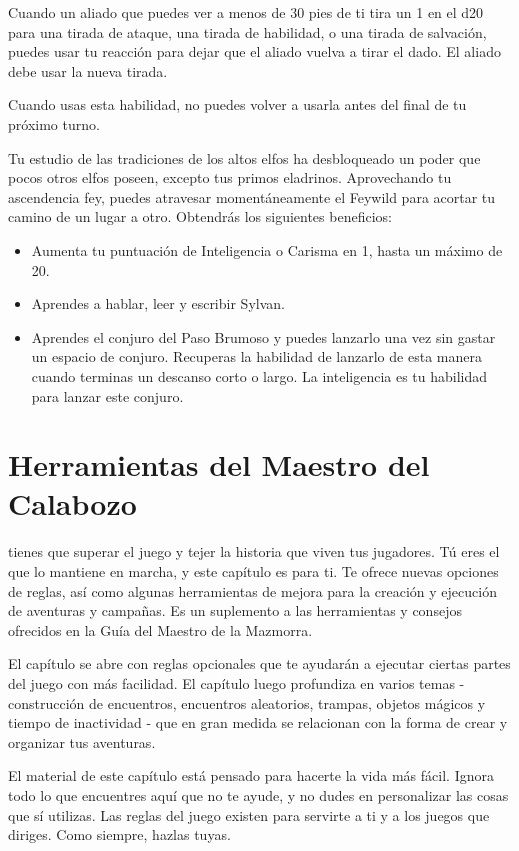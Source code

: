 \documentclass[a4paper,twocolumn,openany,10pt]{dndbook}
\begin{document}
Cuando un aliado que puedes ver a menos de 30 pies de ti tira un 1 en el d20 para una tirada de ataque, una tirada de habilidad,
o una tirada de salvación, puedes usar tu reacción para dejar que el aliado vuelva a tirar el dado. El aliado debe usar la nueva
tirada.

Cuando usas esta habilidad, no puedes volver a usarla antes del final de tu próximo turno.

Tu estudio de las tradiciones de los altos elfos ha desbloqueado un poder que pocos otros elfos poseen, excepto tus primos
eladrinos. Aprovechando tu ascendencia fey, puedes atravesar momentáneamente el Feywild para acortar tu camino de un lugar a
otro. Obtendrás los siguientes beneficios:
\begin{itemize}
\item Aumenta tu puntuación de Inteligencia o Carisma en 1, hasta un máximo de 20.
\item Aprendes a hablar, leer y escribir Sylvan.
\item Aprendes el conjuro del Paso Brumoso y puedes lanzarlo una vez sin gastar un espacio de conjuro. Recuperas la habilidad
de lanzarlo de esta manera cuando terminas un descanso corto o largo. La inteligencia es tu habilidad para lanzar este conjuro.
\end{itemize}

\chapter{Herramientas del Maestro del Calabozo}

 tienes que superar el juego y tejer la historia que viven tus jugadores. Tú
eres el que lo mantiene en marcha, y este capítulo es para ti. Te ofrece nuevas opciones de reglas, así como algunas herramientas
de mejora para la creación y ejecución de aventuras y campañas. Es un suplemento a las herramientas y consejos ofrecidos en la
Guía del Maestro de la Mazmorra.

El capítulo se abre con reglas opcionales que te ayudarán a ejecutar ciertas partes del juego con más facilidad. El capítulo luego
profundiza en varios temas - construcción de encuentros, encuentros aleatorios, trampas, objetos mágicos y tiempo de inactividad -
que en gran medida se relacionan con la forma de crear y organizar tus aventuras.

El material de este capítulo está pensado para hacerte la vida más fácil. Ignora todo lo que encuentres aquí que no te ayude, y no
dudes en personalizar las cosas que sí utilizas. Las reglas del juego existen para servirte a ti y a los juegos que diriges. Como
siempre, hazlas tuyas.
\end{document}

